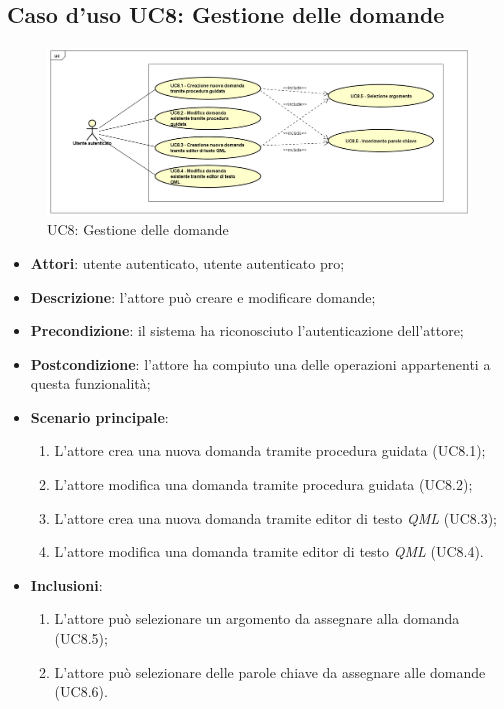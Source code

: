 \newpage
\subsection{Caso d'uso UC8: Gestione delle domande}
	\label{UC8}
	\begin{figure}[h]
		\centering
			\includegraphics[scale=0.45,keepaspectratio]{UML/UC8.png}
		\caption{UC8: Gestione delle domande}
	\end{figure}
	\FloatBarrier
	\begin{itemize}
		\item
			\textbf{Attori}: utente autenticato, utente autenticato pro;
		\item		
			\textbf{Descrizione}: l'attore può creare e modificare domande;
		\item
			\textbf{Precondizione}: il sistema ha riconosciuto l'autenticazione dell'attore; 
		\item
			\textbf{Postcondizione}: l'attore ha compiuto una delle operazioni appartenenti a questa funzionalità;
		\item
			\textbf{Scenario principale}:
	       		\begin{enumerate}
					\item
					L'attore crea una nuova domanda tramite procedura guidata (UC8.1);
					\item
					L'attore modifica una domanda tramite procedura guidata (UC8.2);
					\item
					L'attore crea una nuova domanda tramite editor di testo \textit{QML} (UC8.3);
					\item
					L'attore modifica una domanda tramite editor di testo \textit{QML} (UC8.4).
	 			\end{enumerate}
		\item \textbf{Inclusioni}: 
			\begin{enumerate}
				\item L'attore può selezionare un argomento da assegnare alla domanda (UC8.5);
				\item L'attore può selezionare delle parole chiave da assegnare alle domande (UC8.6).
			\end{enumerate}
	\end{itemize}
